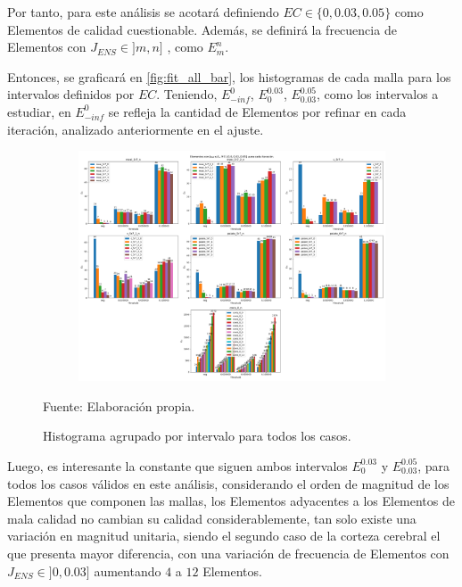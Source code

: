 Por tanto, para este análisis se acotará definiendo $EC \in \{0, 0.03, 0.05\}$ como Elementos de calidad cuestionable.
Además, se definirá la frecuencia de Elementos con $J_{ENS} \in ]m, n]$ , como $E^{n}_{m}$.

Entonces, se graficará en \autoref{fig:fit_all_bar}, los histogramas de cada malla para los intervalos definidos por $EC$.
Teniendo, $E^{0}_{-inf}$, $E^{0.03}_{0}$, $E^{0.05}_{0.03}$, como los intervalos a estudiar, en $E^{0}_{-inf}$ se refleja la cantidad de Elementos por refinar en cada iteración, analizado anteriormente en el ajuste.

\begin{figure}[!ht]
	\centering
	\begin{subfigure}[t]{1.0\textwidth}
		\includegraphics[width=0.75\paperheight, angle=90, origin=c]{figures/analysis/fit_all_bar.png}
	\end{subfigure}
	\caption{ Histograma agrupado por intervalo para todos los casos. }
	Fuente: Elaboración propia.
	\label{fig:fit_all_bar}
\end{figure}

Luego, es interesante la constante que siguen ambos intervalos $E^{0.03}_{0}$ y $E^{0.05}_{0.03}$, para todos los casos válidos en este análisis, considerando el orden de magnitud de los Elementos que componen las mallas, los Elementos adyacentes a los Elementos de mala calidad no cambian su calidad considerablemente, tan solo existe una variación en magnitud unitaria, siendo el segundo caso de la corteza cerebral el que presenta mayor diferencia, con una variación de frecuencia de Elementos con $J_{ENS} \in ]0, 0.03]$ aumentando $4$ a $12$ Elementos.


